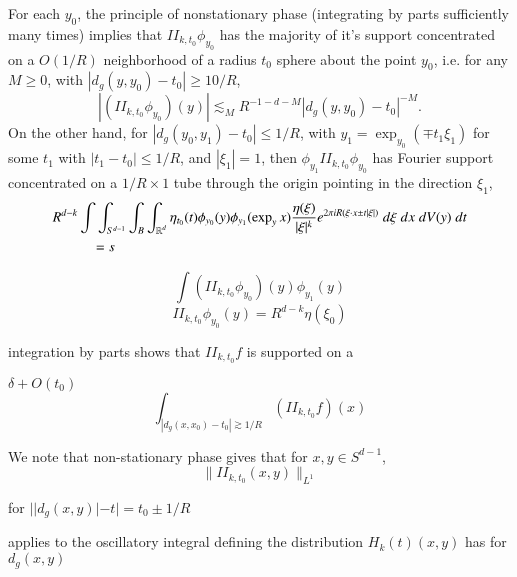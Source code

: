 For each $y_0$, the principle of nonstationary phase (integrating by parts sufficiently many times) implies that $II_{k,t_0} \phi_{y_0}$ has the majority of it's support concentrated on a $O(1/R)$ neighborhood of a radius $t_0$ sphere about the point $y_0$, i.e. for any $M \geq 0$, with $|d_g(y,y_0) - t_0| \geq 10 / R$,
%
\[ |(II_{k,t_0} \phi_{y_0})(y)| \lesssim_M R^{-1-d-M} |d_g(y,y_0) - t_0|^{-M}. \]
%
On the other hand, for $|d_g(y_0,y_1) - t_0| \leq 1/R$, with $y_1 = \exp_{y_0}(\mp t_1 \xi_1)$ for some $t_1$ with $|t_1 - t_0| \leq 1/R$, and $|\xi_1| = 1$, then $\phi_{y_1} II_{k,t_0} \phi_{y_0}$ has Fourier support concentrated on a $1/R \times 1$ tube through the origin pointing in the direction $\xi_1$,
%
\begin{align*}
    R^{d-k} & \int \int_{S^{d-1}} \int_B \int_{\operatorname{\mathbb{R}}^d} \eta_{t_0}(t) \phi_{y_0}(y) \phi_{y_1}( \exp_y x ) \frac{\eta(\xi)}{|\xi|^k} e^{2 \pi i R (\xi \cdot x \pm t |\xi|)}\; d\xi\; dx\; dV(y)\; dt\\
    &\quad = s
\end{align*}


\[ \int (II_{k,t_0} \phi_{y_0})(y) \phi_{y_1}(y) \]
\[ II_{k,t_0} \phi_{y_0}(y) = R^{d-k} \eta(\xi_0) \]

 integration by parts shows that $II_{k,t_0} f$ is supported on a 

$\delta + O(t_0)$
%
\[ \int_{|d_g(x,x_0) - t_0| \gtrsim 1/R} (II_{k,t_0} f)(x) \]

We note that non-stationary phase gives that for $x,y \in S^{d-1}$,
%
\[ \| II_{k,t_0}(x,y) \|_{L^1} \]

for $||d_g(x,y)| - t| = t_0 \pm 1/R$

 applies to the oscillatory integral defining the distribution $H_k(t)(x,y)$ has  for $d_g(x,y)$



